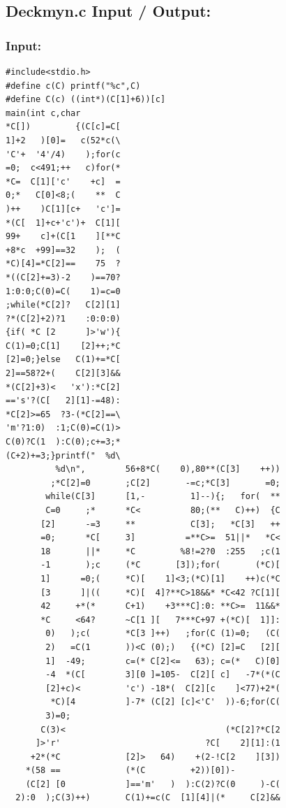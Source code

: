 \documentclass[11pt]{article}
\begin{document}
\pagebreak

\subsection*{Deckmyn.c Input / Output:}
\subsubsection*{Input:}

\begin{lstlisting}
#include<stdio.h>
#define c(C) printf("%c",C)
#define C(c) ((int*)(C[1]+6))[c]
main(int c,char    
*C[])         {(C[c]=C[
1]+2   )[0]=   c(52*c(\
'C'+  '4'/4)    );for(c
=0;  c<491;++   c)for(*
*C=  C[1]['c'    +c]  =
0;*   C[0]<8;(    **  C
)++    )C[1][c+   'c']=
*(C[  1]+c+'c')+  C[1][
99+    c]+(C[1    ][**C
+8*c  +99]==32    );  (
*C)[4]=*C[2]==    75  ?
*((C[2]+=3)-2    )==70?
1:0:0;C(0)=C(    1)=c=0
;while(*C[2]?   C[2][1]
?*(C[2]+2)?1    :0:0:0)
{if( *C [2      ]>'w'){
C(1)=0;C[1]    [2]++;*C
[2]=0;}else   C(1)+=*C[
2]==58?2+(    C[2][3]&&
*(C[2]+3)<   'x'):*C[2]
=='s'?(C[   2][1]-=48):
*C[2]>=65  ?3-(*C[2]==\
'm'?1:0)  :1;C(0)=C(1)>
C(0)?C(1  ):C(0);c+=3;*
(C+2)+=3;}printf("  %d\
          %d\n",        56+8*C(    0),80**(C[3]    ++))
         ;*C[2]=0       ;C[2]       -=c;*C[3]       =0;
        while(C[3]      [1,-         1]--){;   for(  **
        C=0     ;*      *C<          80;(**   C)++)  {C
       [2]      -=3     **           C[3];   *C[3]   ++
       =0;      *C[     3]          =**C>=  51||*   *C<
       18       ||*     *C         %8!=2?0  :255   ;c(1
       -1       );c     (*C       [3]);for(       (*C)[
       1]      =0;(     *C)[    1]<3;(*C)[1]    ++)c(*C
       [3      ]|((     *C)[  4]?**C>18&&* *C<42 ?C[1][
       42     +*(*      C+1)    +3***C]:0: **C>=  11&&*
       *C     <64?      ~C[1 ][   7***C+97 +(*C)[  1]]:
        0)   );c(       *C[3 ]++)   ;for(C (1)=0;   (C(
        2)   =C(1       ))<C (0);)   {(*C) [2]=C   [2][
        1]  -49;        c=(* C[2]<=   63); c=(*   C)[0]
        -4  *(C[        3][0 ]=105-  C[2][ c]   -7*(*(C
        [2]+c)<         'c') -18*(  C[2][c    ]<77)+2*(
         *C)[4          ]-7* (C[2] [c]<'C'  ))-6;for(C(
        3)=0;                                          
       C(3)<                                (*C[2]?*C[2
      ]>'r'                             ?C[    2][1]:(1
     +2*(*C             [2]>   64)    +(2-!C[2    ][3])
    *(58 ==             (*(C         +2))[0])-         
    (C[2] [0            ]=='m'   )  ):C(2)?C(0     )-C(
  2):0  );C(3)++)       C(1)+=c(C  [1][4]|(*     C[2]&&

\end{lstlisting}
\end{document}
